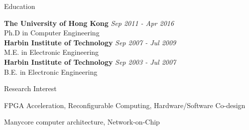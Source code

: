 \documentclass{resume} %
\begin{document}
\begin{rSection}{Education}

{\bf The University of Hong Kong} \hfill {\em Sep 2011 - Apr 2016} \\ 
Ph.D in Computer Engineering \\
{\bf Harbin Institute of Technology} \hfill {\em Sep 2007 - Jul 2009} \\
M.E. in Electronic Engineering \\
{\bf Harbin Institute of Technology} \hfill {\em Sep 2003 - Jul 2007} \\
B.E. in Electronic Engineering \\

\end{rSection}

\begin{rSection}{Research Interest}
    \vspace{-1em}
\item FPGA Acceleration, Reconfigurable Computing, Hardware/Software Co-design
    \vspace{-0.5em}
\item Manycore computer architecture, Network-on-Chip 
    \vspace{-0.5em}
\end{rSection}
\end{document}
